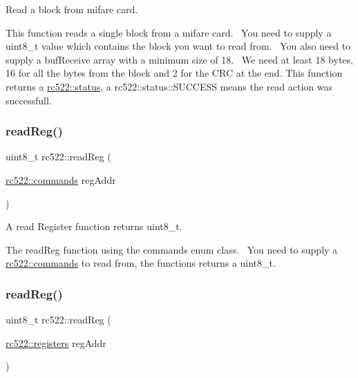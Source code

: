 Read a block from mifare card. 

This function reads a single block from a mifare card.~\newline
You need to supply a uint8\+\_\+t value which contains the block you want to read from.~\newline
You also need to supply a buf\+Receive array with a minimum size of 18.~\newline
We need at least 18 bytes, 16 for all the bytes from the block and 2 for the C\+RC at the end. This function returns a \hyperlink{classspiReader_a4bcf984823c38cf4841ebf619e788790}{rc522\+::status}, a rc522\+::status\+::\+S\+U\+C\+C\+E\+SS means the read action was successfull. \mbox{\label{classrc522_a98c225391f24da6a963e67b5e89f96be}} 
\subsubsection{\texorpdfstring{read\+Reg()}{readReg()}\hspace{0.1cm}{\footnotesize\ttfamily [1/4]}}
{\footnotesize\ttfamily uint8\+\_\+t rc522\+::read\+Reg (\begin{DoxyParamCaption}\item[{\hyperlink{classrc522_a6df2359c88d6c2f47faf58bc9e09eaa4}{rc522\+::commands}}]{reg\+Addr }\end{DoxyParamCaption})}



A read Register function returns uint8\+\_\+t. 

The read\+Reg function using the commands enum class.~\newline
You need to supply a \hyperlink{classrc522_a6df2359c88d6c2f47faf58bc9e09eaa4}{rc522\+::commands} to read from, the functions returns a uint8\+\_\+t. \mbox{\label{classrc522_a9398f2a0effc1a0acd48735d7d014c6e}} 
\subsubsection{\texorpdfstring{read\+Reg()}{readReg()}\hspace{0.1cm}{\footnotesize\ttfamily [2/4]}}
{\footnotesize\ttfamily uint8\+\_\+t rc522\+::read\+Reg (\begin{DoxyParamCaption}\item[{\hyperlink{classrc522_a83057db5f8fefa3dc9a6e8e5f0e191ee}{rc522\+::registers}}]{reg\+Addr }\end{DoxyParamCaption})}



